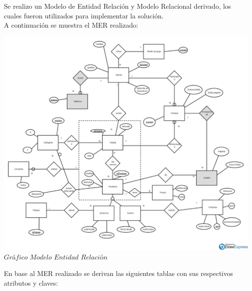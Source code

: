 Se realizo un Modelo de Entidad Relación y Modelo Relacional derivado, los cuales fueron utilizados para implementar la solución. \\

A continuación se muestra el MER realizado:\\

\vspace*{0.3cm} \vspace*{0.3cm}
  \begin{center}
 \includegraphics[scale=0.43]{der.jpeg}
 {$Gr$\'a$fico$ $Modelo$ $Entidad$ $Relaci$\'o$n$}
  \end{center}
  \vspace*{0.3cm}
  
En base al MER realizado se derivan las siguientes tablas con sus respectivos atributos y claves:\\

